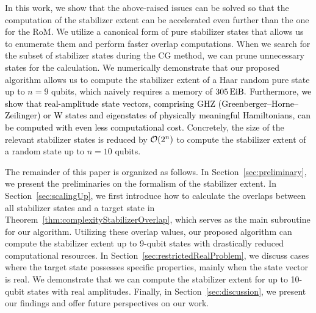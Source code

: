 \documentclass[aps,prx,onecolumn,superscriptaddress,nobibnotes,nofootinbib]{revtex4-2}
\newcommand{\black}[1]{\textcolor{black}{#1}}
\begin{document}
In this work, we show that the above-raised issues can be solved so that the computation of the stabilizer extent can be accelerated even further than the one for the RoM.
We utilize a canonical form of pure stabilizer states that allows us to enumerate them and perform \black{faster} overlap computations. When we search for the subset of stabilizer states during the CG method, we can prune unnecessary states for the calculation.
We numerically demonstrate that our proposed algorithm allows us to compute the stabilizer extent of a Haar random pure state up to $n=9$ qubits, which naively requires a memory of $\SI{305}{\exbi\byte}.$
\black{Furthermore, we show that real-amplitude state vectors, comprising GHZ (Greenberger--Horne--Zeilinger) or W states and eigenstates of physically meaningful Hamiltonians, can be computed with even less computational cost.}
Concretely, the size of the relevant stabilizer states is reduced by $\order{2^n}$ to compute the stabilizer extent of a random state up to $n=10$ qubits.

The remainder of this paper is organized as follows.
In Section~\ref{sec:preliminary}, we present the preliminaries on the formalism of the stabilizer extent.
In Section~\ref{sec:scalingUp}, we first introduce how to calculate the overlaps between all stabilizer states and a target state in Theorem~\ref{thm:complexityStabilizerOverlap}, which serves as the main subroutine for our algorithm.
Utilizing these overlap values, our proposed algorithm can compute the stabilizer extent up to 9-qubit states with drastically reduced computational resources.
In Section~\ref{sec:restrictedRealProblem}, we discuss cases where the target state possesses specific properties, mainly when the state vector is real.
We demonstrate that we can compute the stabilizer extent for up to 10-qubit states with real amplitudes.
Finally, in Section~\ref{sec:discussion}, we present our findings and offer future perspectives on our work.
\end{document}
